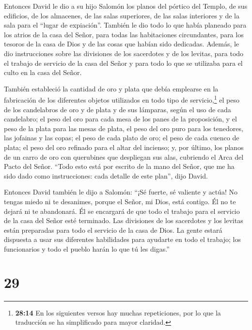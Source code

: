  Entonces David le dio a su hijo Salomón los planos del
pórtico del Templo, de sus edificios, de los almacenes, de las salas
superiores, de las salas interiores y de la sala para el ``lugar de
expiación''.  También le dio todo lo que había planeado
para los atrios de la casa del Señor, para todas las habitaciones
circundantes, para los tesoros de la casa de Dios y de las cosas que
habían sido dedicadas.  Además, le dio instrucciones sobre
las divisiones de los sacerdotes y de los levitas, para todo el trabajo
de servicio de la casa del Señor y para todo lo que se utilizaba para el
culto en la casa del Señor.

 También estableció la cantidad de oro y plata que debía
emplearse en la fabricación de los diferentes objetos utilizados en todo
tipo de servicio,\footnote{\textbf{28:14} En los siguientes versos hay
  muchas repeticiones, por lo que la traducción se ha simplificado para
  mayor claridad.}  el peso de los candelabros de oro y de
plata y de sus lámparas, según el uso de cada candelabro; 
el peso del oro para cada mesa de los panes de la proposición, y el peso
de la plata para las mesas de plata,  el peso del oro puro
para los tenedores, las jofainas y las copas; el peso de cada plato de
oro; el peso de cada cuenco de plata;  el peso del oro
refinado para el altar del incienso; y, por último, los planos de un
carro de oro con querubines que despliegan sus alas, cubriendo el Arca
del Pacto del Señor.  ``Todo esto está por escrito de la
mano del Señor, que me ha sido dado como instrucciones: cada detalle de
este plan'', dijo David.

 Entonces David también le dijo a Salomón: ``¡Sé fuerte, sé
valiente y actúa! No tengas miedo ni te desanimes, porque el Señor, mi
Dios, está contigo. Él no te dejará ni te abandonará. Él se encargará de
que todo el trabajo para el servicio de la casa del Señor esté
terminado.  Las divisiones de los sacerdotes y los levitas
están preparadas para todo el servicio de la casa de Dios. La gente
estará dispuesta a usar sus diferentes habilidades para ayudarte en todo
el trabajo; los funcionarios y todo el pueblo harán lo que tú les
digas.''

\hypertarget{section-28}{%
\section{29}\label{section-28}}

